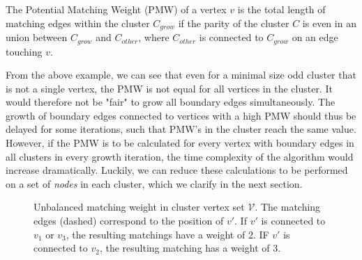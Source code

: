 \begin{lemma}
  The Potential Matching Weight (PMW) of a vertex $v$ is the total length of matching edges within the cluster $C_{grow}$ if the parity of the cluster $C$ is even in an union between $C_{grow}$ and $C_{other}$, where $C_{other}$ is connected to $C_{grow}$ on an edge touching $v$.
\end{lemma}

From the above example, we can see that even for a minimal size odd cluster that is not a single vertex, the PMW is not equal for all vertices in the cluster. It would therefore not be "fair" to grow all boundary edges simultaneously. The growth of boundary edges connected to vertices with a high PMW should thus be delayed for some iterations, such that PMW's in the cluster reach the same value. However, if the PMW is to be calculated for every vertex with boundary edges in all clusters in every growth iteration, the time complexity of the algorithm would increase dramatically. Luckily, we can reduce these calculations to be performed on a set of \emph{nodes} in each cluster, which we clarify in the next section.

\begin{figure}
  \centering
  \vspace{1em}
  \caption{Unbalanced matching weight in cluster vertex set $\mathcal{V}$. The matching edges (dashed) correspond to the position of $v'$. If $v'$ is connected to $v_1$ or $v_3$, the resulting matchings have a weight of 2. IF $v'$ is connected to $v_2$, the resulting matching has a weight of 3.}\label{fig:PMW}
\end{figure}

